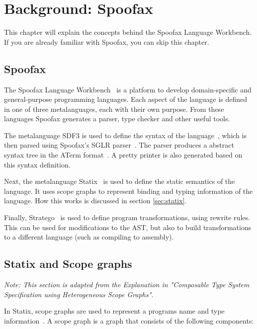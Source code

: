 \chapter{\label{chap:bg-spoofax}Background: Spoofax}

This chapter will explain the concepts behind the Spoofax Language Workbench. If you are already familiar with Spoofax, you can skip this chapter. 

\section{Spoofax}

The Spoofax Language Workbench~\cite{spoofax} is a platform to develop domain-specific and
general-purpose programming languages. Each aspect of the language is defined in one of three metalanguages, each with their own purpose. From these languages Spoofax generates a parser, type checker and other useful tools. 

The metalanguage SDF3 is used to define the syntax of the language~\cite{sdf3}, which is then parsed using Spoofax's SGLR parser~\cite{sdf3_parser}. The parser produces a abstract syntax tree in the ATerm format~\cite{aterm}. A pretty printer is also generated based on this syntax definition. 

Next, the metalanguage Statix~\cite{scopes_as_types} is used to define the static semantics of the language. It uses scope graphs to represent binding and typing information of the language. How this works is discussed in section \ref{sec:statix}.

Finally, Stratego~\cite{stratego} is used to define program transformations, using rewrite rules. This can be used for modifications to the AST, but also to build transformations to a different language (such as compiling to assembly). 

\section{\label{sec:statix}Statix and Scope graphs}

\textit{Note: This section is adapted from the Explanation in "Composable Type System Specification
	using Heterogeneous Scope Graphs".~\cite[sect. 4.1.2]{Zwaan21}}

In Statix, scope graphs are used to represent a programs name and type information~\cite{scopes_as_types}. A scope graph is a graph that consists of the following components:

